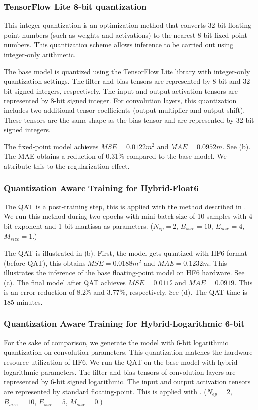 \subsubsection{TensorFlow Lite 8-bit quantization}
This integer quantization is an optimization method that converts 32-bit floating-point numbers (such as weights and activations) to the nearest 8-bit fixed-point numbers. This quantization scheme allows inference to be carried out using integer-only arithmetic\cite{hannwindowsine}.

The base model is quantized using the TensorFlow Lite library with integer-only quantization settings. The filter and bias tensors are represented by 8-bit and 32-bit signed integers, respectively. The input and output activation tensors are represented by 8-bit signed integer. For convolution layers, this quantization includes two additional tensor coefficients (output-multiplier and output-shift). These tensors are the same shape as the bias tensor and are represented by 32-bit signed integers.

The fixed-point model achieves $MSE=0.0122 m^2$ and $MAE=0.0952m$. See (b). The MAE obtains a reduction of 0.31\% compared to the base model. We attribute this to the regularization effect.

\subsubsection{Quantization Aware Training for Hybrid-Float6}
The QAT is a post-training step, this is applied with the method described in . We run this method during two epochs with mini-batch size of 10 samples with 4-bit exponent and 1-bit mantissa as parameters. ($N_{ep}=2$, $B_{size}=10$, $E_{size}=4$, $M_{size}=1$.)

The QAT is illustrated in (b). First, the model gets quantized with HF6 format (before QAT), this obtains $MSE=0.0188m^2$ and $MAE=0.1232m$. This illustrates the inference of the base floating-point model on HF6 hardware. See (c). The final model after QAT achieves $MSE=0.0112$ and $MAE=0.0919$. This is an error reduction of 8.2\% and 3.77\%, respectively. See (d). The QAT time is 185 minutes.

\subsubsection{Quantization Aware Training for Hybrid-Logarithmic 6-bit}
For the sake of comparison, we generate the model with 6-bit logarithmic quantization on convolution parameters. This quantization matches the hardware resource utilization of HF6. We run the QAT on the base model with hybrid logarithmic parameters. The filter and bias tensors of convolution layers are represented by 6-bit signed logarithmic. The input and output activation tensors are represented by standard floating-point. This is applied with . ($N_{ep}=2$, $B_{size}=10$, $E_{size}=5$, $M_{size}=0$.)

